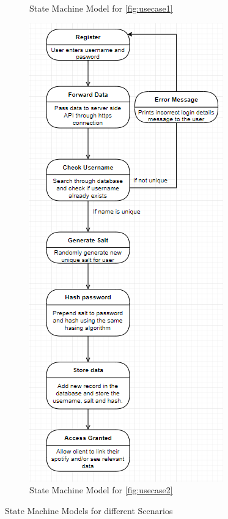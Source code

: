 \documentclass[10pt, notitlepage]{report}
\begin{document}
\begin{figure}[h]
{\begin{subfigure}{0.5\textwidth}
	\caption{State Machine Model for \ref{fig:usecase1}}
	\label{fig:statemach1}
\end{subfigure}%
\begin{subfigure}{0.5\textwidth}
	\centering	
	\includegraphics[width=1\linewidth]{statemach2.png}
	\caption{State Machine Model for \ref{fig:usecase2}}
	\label{fig:statemach2}
\end{subfigure}
}

\caption{State Machine Models for different Scenarios}
\label{fig:statemach}

\end{figure}
\end{document}
